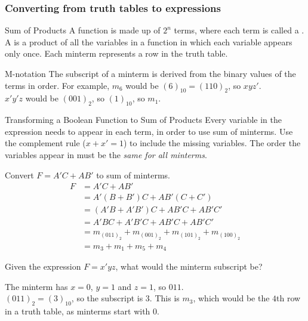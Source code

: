 \documentclass[../notes.tex]{subfiles}
\begin{document}
				\subsubsection{Converting from truth tables to expressions}
					\begin{definition}{Sum of Products}
						A function is made up of $2^{n}$ terms, where each term is called a \concept{minterm}. A  is a product of all the variables in a function in which each variable appears only once. Each minterm represents a row in the truth table.
					\end{definition}
					\begin{definition}{M-notation}
						The subscript of a minterm is derived from the binary values of the terms in order. For example, $m_{6}$ would be $(6)_{10} = (110)_{2}$, so $xyz'$.\\
						$x'y'z$ would be $(001)_{2}$, so $(1)_{10}$, so $m_{1}$.
					\end{definition}
					\begin{sidenote}{Transforming a Boolean Function to Sum of Products}
						Every variable in the expression needs to appear in each term, in order to use sum of minterms. Use the complement rule ($x + x' = 1$) to include the missing variables. The order the variables appear in must be the \emph{same for all minterms}.
					\end{sidenote}
					\begin{example}
						Convert $F = A'C + AB'$ to sum of minterms.
						\begin{align*}
							F &= A'C + AB'\\
							  &= A'\left(B + B'\right)C + AB'\left(C + C'\right)\\
								&= \left(A'B + A'B'\right)C + AB'C + AB'C'\\
								&= A'BC + A'B'C + AB'C + AB'C'\\
								&= m_{(011)_{2}} + m_{(001)_{2}} + m_{(101)_{2}} + m_{(100)_{2}}\\
								&= m_{3} + m_{1} + m_{5} + m_{4}
						\end{align*}
					\end{example}
					\begin{example}
						Given the expression $F = x'yz$, what would the minterm subscript be?
						\begin{indentparagraph}
							The minterm has $x = 0$, $y = 1$ and $z = 1$, so $011$.\\
							$(011)_{2} = (3)_{10}$, so the subscript is $3$. This is $m_{3}$, which would be the $4$th row in a truth table, as minterms start with $0$.
						\end{indentparagraph}
					\end{example}
\end{document}

